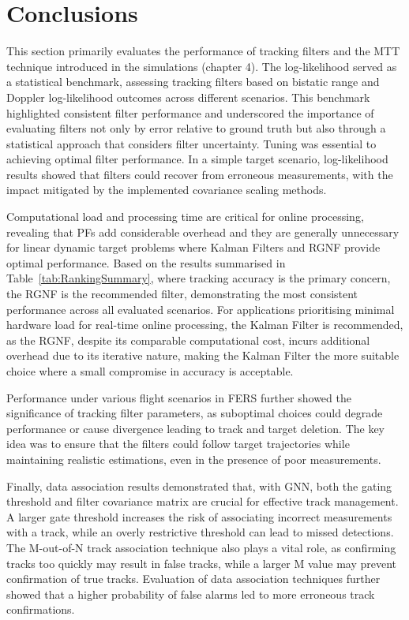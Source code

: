 \section{Conclusions}
This section primarily evaluates the performance of tracking filters and the \ac{MTT} technique introduced in the simulations (chapter 4). The log-likelihood served as a statistical benchmark, assessing tracking filters based on bistatic range and Doppler log-likelihood outcomes across different scenarios. This benchmark highlighted consistent filter performance and underscored the importance of evaluating filters not only by error relative to ground truth but also through a statistical approach that considers filter uncertainty. Tuning was essential to achieving optimal filter performance. In a simple target scenario, log-likelihood results showed that filters could recover from erroneous measurements, with the impact mitigated by the implemented covariance scaling methods.

Computational load and processing time are critical for online processing, revealing that \ac{PF}s add considerable overhead and they are generally unnecessary for linear dynamic target problems where Kalman Filters and \ac{RGNF} provide optimal performance. Based on the results summarised in Table~\ref{tab:RankingSummary}, where tracking accuracy is the primary concern, the \ac{RGNF} is the recommended filter, demonstrating the most consistent performance across all evaluated scenarios. For applications prioritising minimal hardware load for real-time online processing, the Kalman Filter is recommended, as the \ac{RGNF}, despite its comparable computational cost, incurs additional overhead due to its iterative nature, making the Kalman Filter the more suitable choice where a small compromise in accuracy is acceptable.

Performance under various flight scenarios in \ac{FERS} further showed the significance of tracking filter parameters, as suboptimal choices could degrade performance or cause divergence leading to track and target deletion. The key idea was to ensure that the filters could follow target trajectories while maintaining realistic estimations, even in the presence of poor measurements.

Finally, data association results demonstrated that, with \ac{GNN}, both the gating threshold and filter covariance matrix are crucial for effective track management. A larger gate threshold increases the risk of associating incorrect measurements with a track, while an overly restrictive threshold can lead to missed detections. The M-out-of-N track association technique also plays a vital role, as confirming tracks too quickly may result in false tracks, while a larger M value may prevent confirmation of true tracks. Evaluation of data association techniques further showed that a higher probability of false alarms led to more erroneous track confirmations.